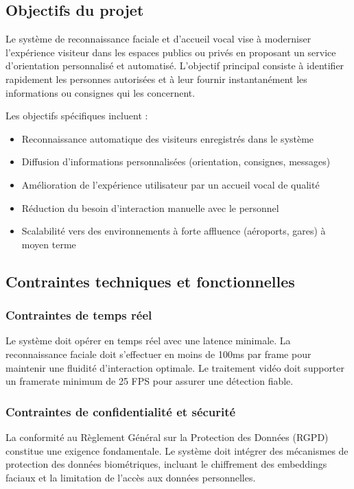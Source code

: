 \documentclass[12pt,a4paper]{article}
\begin{document}
\subsection{Objectifs du projet}

Le système de reconnaissance faciale et d’accueil vocal vise à moderniser l’expérience visiteur dans les espaces publics ou privés en proposant un service d’orientation personnalisé et automatisé. L’objectif principal consiste à identifier rapidement les personnes autorisées et à leur fournir instantanément les informations ou consignes qui les concernent.

Les objectifs spécifiques incluent :
\begin{itemize}
\item Reconnaissance automatique des visiteurs enregistrés dans le système
\item Diffusion d’informations personnalisées (orientation, consignes, messages)
\item Amélioration de l’expérience utilisateur par un accueil vocal de qualité
\item Réduction du besoin d’interaction manuelle avec le personnel
\item Scalabilité vers des environnements à forte affluence (aéroports, gares) à moyen terme
\end{itemize}

\subsection{Contraintes techniques et fonctionnelles}

\subsubsection{Contraintes de temps réel}

Le système doit opérer en temps réel avec une latence minimale. La reconnaissance faciale doit s'effectuer en moins de 100ms par frame pour maintenir une fluidité d'interaction optimale. Le traitement vidéo doit supporter un framerate minimum de 25 FPS pour assurer une détection fiable.

\subsubsection{Contraintes de confidentialité et sécurité}

La conformité au Règlement Général sur la Protection des Données (RGPD) constitue une exigence fondamentale. Le système doit intégrer des mécanismes de protection des données biométriques, incluant le chiffrement des embeddings faciaux et la limitation de l'accès aux données personnelles.
\end{document}
